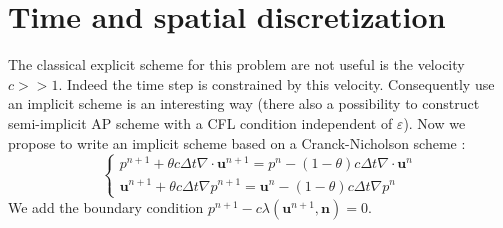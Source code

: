 \documentclass[a4paper,twoside,french,english,11pt]{article}
\newcommand{\ds}{\displaystyle}
\newcommand{\eps}{\varepsilon}
\begin{document}
\section{Time and spatial discretization}
The classical explicit scheme for this problem are not useful is the velocity $c>>1$. Indeed the time step is constrained by this velocity. Consequently use an implicit scheme is an interesting way (there also a possibility to construct semi-implicit AP scheme with a CFL condition independent of $\eps$). Now we propose to write an implicit scheme based on a Cranck-Nicholson scheme :
$$
\left\{\begin{array}{l}
\ds p^{n+1} + \theta c\Delta t \nabla \cdot \mathbf{u}^{n+1}=  p^n- (1-\theta) c \Delta t   \nabla \cdot \mathbf{u}^{n}\\
\ds \mathbf{u}^{n+1}+\theta c \Delta t \nabla p^{n+1}= \mathbf{u}^n-(1-\theta ) c\Delta t \nabla p^{n}\end{array}\right.
$$
We add the boundary condition $p^{n+1}-c \lambda (\bm{u}^{n+1},\bm{n})=0$.
\end{document}
